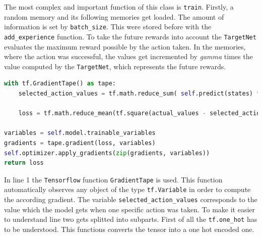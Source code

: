 \documentclass[12pt]{article}
\begin{document}
The most complex and important function of this class is \lstinline{train}. Firstly, a random memory and its following memories get loaded. The amount of information is set by \lstinline{batch_size}. This were stored before with the \lstinline{add_experience} function. To take the future rewards into account the \lstinline{TargetNet} evaluates the maximum reward possible by the action taken. In the memories, where the action was successful, the values get incremented by \textit{gamma} times the value computed by the  \lstinline{TargetNet}, which represents the future rewards. 
\begin{lstlisting}[language=Python, caption = Example - Optimization of the network]
with tf.GradientTape() as tape:
    selected_action_values = tf.math.reduce_sum( self.predict(states) * tf.one_hot(actions, self.num_actions), axis=1) 

    loss = tf.math.reduce_mean(tf.square(actual_values - selected_action_values)) 
    
variables = self.model.trainable_variables
gradients = tape.gradient(loss, variables)
self.optimizer.apply_gradients(zip(gradients, variables)) 
return loss
\end{lstlisting}
In line 1 the \lstinline{Tensorflow} function \lstinline{GradientTape} is used. This function automatically observes any object of the type \lstinline{tf.Variable} in order to compute the according gradient\cite{tf.grad}. The variable \lstinline{selected_action_values} corresponds to the value which the model gets when one specific action was taken.
 To make it easier to understand line two gets splitted into subparts. First of all the \lstinline{tf.one_hot} has to be understood. This functions converts the tensor into a one hot encoded one.
\end{document}
